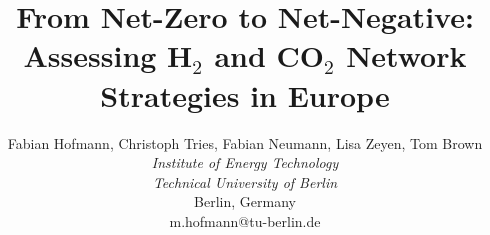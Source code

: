 \documentclass[twocolumn]{article}
\newcommand{\carbon}{CO$_2$}
\newcommand{\hydrogen}{H$_2$}
\begin{document}


\title{From Net-Zero to Net-Negative: Assessing \hydrogen{} and \carbon{} Network Strategies in Europe}

\author{
    Fabian Hofmann, Christoph Tries, Fabian Neumann, Lisa Zeyen, Tom Brown \\
    \textit{Institute of Energy Technology} \\
    \textit{Technical University of Berlin}\\
    Berlin, Germany \\
    m.hofmann@tu-berlin.de
}


\maketitle
\end{document}
